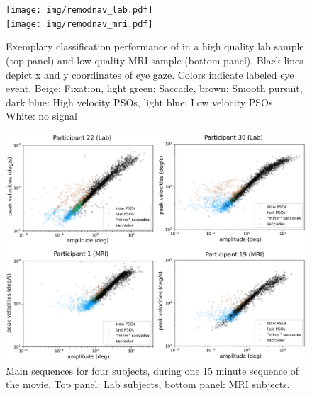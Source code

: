     \begin{figure}[h!]
        \texttt{[image: img/remodnav\_lab.pdf]} \\
        \texttt{[image: img/remodnav\_mri.pdf]}\\
        \caption{Exemplary classification
        performance of \remodnav in a high quality lab sample (top panel) and low quality MRI sample (bottom panel).
        Black lines depict x and y coordinates of eye gaze. Colors indicate labeled eye event. Beige: Fixation,
        light green: Saccade, brown: Smooth pursuit, dark blue: High velocity PSOs, light blue: Low velocity PSOs.
        White: no signal}
        \label{fig:remodnav}
    \end{figure}

    \begin{figure}[h!]
        \includegraphics[width=1\textwidth]{img/main_sequences.eps}
        \caption{Main sequences for four subjects, during one 15 minute sequence of
        the movie. Top panel: Lab subjects, bottom panel: MRI subjects.}
        \label{fig:mains}
    \end{figure}

